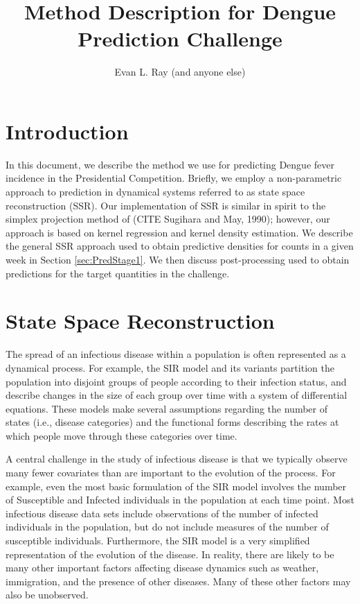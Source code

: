 \documentclass[fleqn]{article}\usepackage[]{graphicx}\usepackage[]{color}
\title{Method Description for Dengue Prediction Challenge}
\date{}
\author{Evan L. Ray (and anyone else)}
\begin{document}
\maketitle

\section{Introduction}
\label{sec:Intro}

In this document, we describe the method we use for predicting Dengue fever incidence in the Presidential Competition.  Briefly, we employ a non-parametric approach to prediction in dynamical systems referred to as state space reconstruction (SSR).  Our implementation of SSR is similar in spirit to the simplex projection method of (CITE Sugihara and May, 1990); however, our approach is based on kernel regression and kernel density estimation.  We describe the general SSR approach used to obtain predictive densities for counts in a given week in Section \ref{sec:PredStage1}.  We then discuss post-processing used to obtain predictions for the target quantities in the challenge.

\section{State Space Reconstruction}
\label{subsec:SSR:Motivation}

The spread of an infectious disease within a population is often represented as a dynamical process.  For example, the SIR model and its variants partition the population into disjoint groups of people according to their infection status, and describe changes in the size of each group over time with a system of differential equations.  These models make several assumptions regarding the number of states (i.e., disease categories) and the functional forms describing the rates at which people move through these categories over time.

A central challenge in the study of infectious disease is that we typically observe many fewer covariates than are important to the evolution of the process.  For example, even the most basic formulation of the SIR model involves the number of Susceptible and Infected individuals in the population at each time point.  Most infectious disease data sets include observations of the number of infected individuals in the population, but do not include measures of the number of susceptible individuals.  Furthermore, the SIR model is a very simplified representation of the evolution of the disease.  In reality, there are likely to be many other important factors affecting disease dynamics such as weather, immigration, and the presence of other diseases.  Many of these other factors may also be unobserved.
\end{document}
